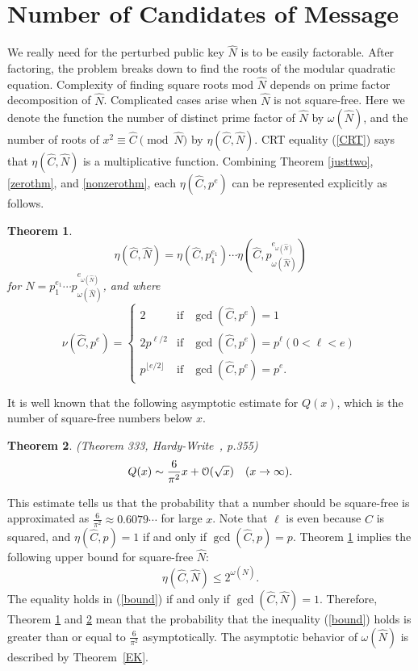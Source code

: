 \documentclass{article}
\newtheorem{thm}{Theorem}
\begin{document}
\section{Number of Candidates of Message}\label{NUM}
We really need for the perturbed public key $\hat{N}$ is to be easily factorable. 
After factoring, the problem breaks down to find the roots of the modular 
quadratic equation. 
Complexity of finding square roots mod $\hat{N}$ depends on prime factor decomposition of $\hat{N}$. 
Complicated cases arise when $\hat{N}$ is not square-free. 
Here we denote the function the number of distinct prime factor of $\hat{N}$ by $\omega(\hat{N})$, 
and the number of roots of $x^2\equiv \hat{C}\pmod{\hat{N}}$ by $\eta(\hat{C},\hat{N})$. 
CRT equality (\ref{CRT}) says that $\eta(\hat{C},\hat{N})$ is a multiplicative function. 
Combining Theorem \ref{justtwo}, \ref{zerothm}, and \ref{nonzerothm}, each $\eta(\hat{C},p^e)$ can be represented explicitly 
as follows.

\begin{thm}\label{th:numberofroots}
$$
\eta(\hat{C},\hat{N}) = \eta(\hat{C},p_1^{e_1})\cdots\eta(\hat{C},p_{\omega(\hat{N})}^{e_{\omega(\hat{N})}})
$$
for $\hat{N}=p_1^{e_1}\cdots p_{\omega(\hat{N})}^{e_{\omega(\hat{N})}}$, and where 
$$
\nu(\hat{C},p^e) = \left\{\begin{array}{lll}
2 & \mbox{if} & \gcd(\hat{C},p^e)=1 \\
2p^{\ell/2} & \mbox{if} & \gcd(\hat{C},p^e)=p^{\ell}(0<\ell<e) \\
p^{\lfloor e/2\rfloor} & \mbox{if} & \gcd(\hat{C},p^e)={p^e}.
\end{array}
\right.
$$
\end{thm}
It is well known that the following asymptotic estimate for 
$Q(x)$, which is the number of square-free numbers below $x$.

\begin{thm}(Theorem 333, Hardy-Write~\cite{Hardy-Wright}, p.355) \label{HWasym}
$$
Q(x) \sim\frac{6}{\pi^2}x+{\cal O}(\sqrt{x})\quad (x\to\infty).
$$
\end{thm}

This estimate tells us that the probability that a number should be square-free 
is approximated as $\frac{6}{\pi^2}\approx 0.6079\cdots$ for large $x$.
Note that $\ell$ is even because $\hat{C}$ is squared, and $\eta(\hat{C},p)=1$ if and only if $\gcd(\hat{C},p)=p$.
Theorem \ref{th:numberofroots} implies the following upper bound for square-free $\hat{N}$:
\begin{equation}\label{bound}
\eta(\hat{C},\hat{N})\leq 2^{\omega(\hat{N})}.
\end{equation}
The equality holds in (\ref{bound}) if and only if $\gcd(\hat{C},\hat{N})=1$. 
Therefore, Theorem \ref{th:numberofroots} and \ref{HWasym} mean that 
the probability that the inequality (\ref{bound}) holds 
is greater than or equal to $\frac{6}{\pi^2}$ asymptotically.
The asymptotic behavior of $\omega(\hat{N})$ is described by Theorem~\ref{EK}.
\end{document}
